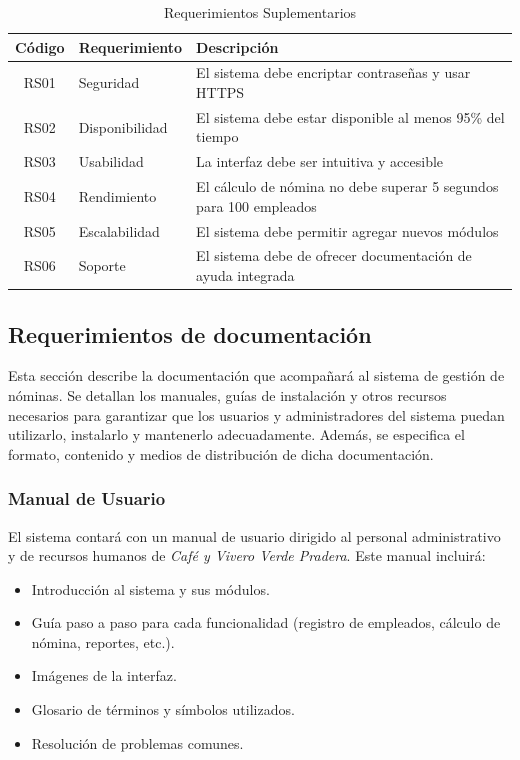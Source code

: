 \begin{table}[h]
	\centering
	\caption{Requerimientos Suplementarios}
	\begin{tabular}{|c|p{4cm}|p{8cm}|}
		\hline
		\textbf{Código} & \textbf{Requerimiento} & \textbf{Descripción}                                               \\ \hline
		RS01            & Seguridad              & El sistema debe encriptar contraseñas y usar HTTPS                 \\ \hline
		RS02            & Disponibilidad         & El sistema debe estar disponible al menos 95\% del tiempo          \\ \hline
		RS03            & Usabilidad             & La interfaz debe ser intuitiva y accesible                         \\ \hline
		RS04            & Rendimiento            & El cálculo de nómina no debe superar 5 segundos para 100 empleados \\ \hline
		RS05            & Escalabilidad          & El sistema debe permitir agregar nuevos módulos                    \\ \hline
		RS06            & Soporte                & El sistema debe de ofrecer documentación de ayuda integrada        \\ \hline
	\end{tabular}
\end{table}

\subsection*{Requerimientos de documentación}

Esta sección describe la documentación que acompañará al sistema de gestión de nóminas.
Se detallan los manuales, guías de instalación y otros recursos necesarios para garantizar
que los usuarios y administradores del sistema puedan utilizarlo, instalarlo y mantenerlo
adecuadamente. Además, se especifica el formato, contenido y medios de distribución de
dicha documentación.

\subsubsection*{Manual de Usuario}

El sistema contará con un manual de usuario dirigido al personal administrativo y de recursos humanos de \textit{Café y Vivero Verde Pradera}. Este manual incluirá:

\begin{itemize}
	\item Introducción al sistema y sus módulos.
	\item Guía paso a paso para cada funcionalidad (registro de empleados, cálculo de nómina, reportes, etc.).
	\item Imágenes de la interfaz.
	\item Glosario de términos y símbolos utilizados.
	\item Resolución de problemas comunes.
\end{itemize}

